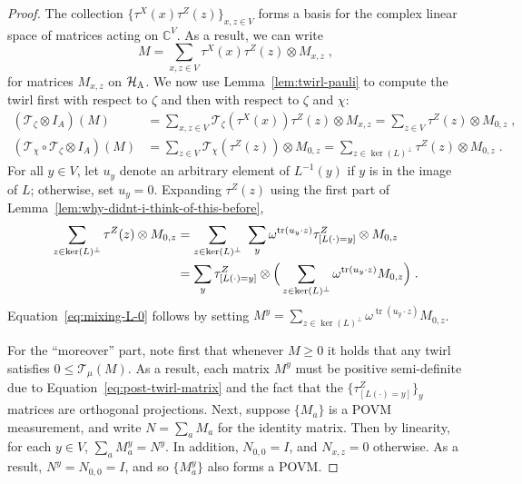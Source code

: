 \documentclass[11pt]{article}
\theoremstyle{definition}
\newcommand{\Id}{\ensuremath{I}}
\newcommand{\C}{\ensuremath{\mathbb{C}}}
\newcommand{\mH}{\ensuremath{\mathcal{H}}}
\DeclareMathOperator{\tr}{tr}
\newcommand{\labelstyle}[1]{\ensuremath{\textsc{#1}}\xspace}
\newcommand{\alice}{\labelstyle{A}}
\begin{document}
\begin{proof}
  The collection $\{\tau^X(x)\tau^Z(z)\}_{x, z \in V}$ forms a basis for the
  complex linear space of matrices acting on $\C^V$.
  As a result, we can write
  \begin{equation*}
    M = \sum_{x, z \in V} \tau^X(x) \tau^Z(z) \otimes M_{x, z}\;,
  \end{equation*}
  for matrices $M_{x,z}$ on $\mH_\alice$.
  We now use Lemma~\ref{lem:twirl-pauli} to compute the twirl first with respect
  to $\zeta$ and then with respect to $\zeta$ and $\chi$:
  \begin{align*}
    (\mathscr{T}_{\zeta} \otimes \Id_{A})(M)
    &= \sum_{x, z \in V} \mathscr{T}_{\zeta}(\tau^X(x)) \tau^Z(z) \otimes M_{x, z}
      = \sum_{z \in V} \tau^Z(z) \otimes M_{0, z}\;,\\
    (\mathscr{T}_{\chi} \circ \mathscr{T}_{\zeta} \otimes \Id_{A})(M)
    &= \sum_{z \in V} \mathscr{T}_{\chi}(\tau^Z(z)) \otimes M_{0, z}
      =  \sum_{z \in \ker(L)^\perp} \tau^Z(z) \otimes M_{0, z}\;.
  \end{align*}
  For all $y \in V$, let $u_y$ denote an arbitrary element of $L^{-1}(y)$ if $y$
  is in the image of $L$; otherwise, set $u_y = 0$.
  Expanding $\tau^Z(z)$ using the first part of
  Lemma~\ref{lem:why-didnt-i-think-of-this-before},
  \begin{align}
    \label{eq:post-twirl-matrix}
    \sum_{z \in \ker(L)^\perp} \tau^Z(z) \otimes M_{0, z}
    & = \sum_{z \in \ker(L)^\perp} \,\, \sum_{y} \omega^{\tr(u_y \cdot z)}
      \tau^Z_{[L(\cdot)=y]} \otimes M_{0, z} \notag \\
    & =  \sum_{y} \tau^Z_{[L(\cdot)=y]} \otimes \Big(\sum_{z \in \ker(L)^\perp}
      \omega^{\tr(u_y \cdot z)}  M_{0, z}\Big)\;.
  \end{align}
  Equation~\eqref{eq:mixing-L-0} follows by setting $M^y = \sum_{z \in
    \ker(L)^\perp} \omega^{\tr(u_y \cdot z)} M_{0, z}$.

  For the ``moreover'' part, note first that whenever $M \geq 0$ it holds that
  any twirl satisfies $0 \leq \mathscr{T}_{\mu}(M)$.
  As a result, each matrix $M^y$ must be positive semi-definite due to
  Equation~\eqref{eq:post-twirl-matrix} and the fact that the
  $\{\tau^Z_{[L(\cdot)=y]}\}_y$ matrices are orthogonal projections.
  Next, suppose $\{M_a\}$ is a POVM measurement, and write $N = \sum_a M_a$ for
  the identity matrix.
  Then by linearity, for each $y \in V$, $\sum_a M_a^y = N^y$.
  In addition, $N_{0, 0} = \Id$, and $N_{x, z} = 0$ otherwise.
  As a result, $N^y = N_{0, 0} = \Id$, and so $\{M_a^y\}$ also forms a POVM.
\end{proof}
\end{document}
